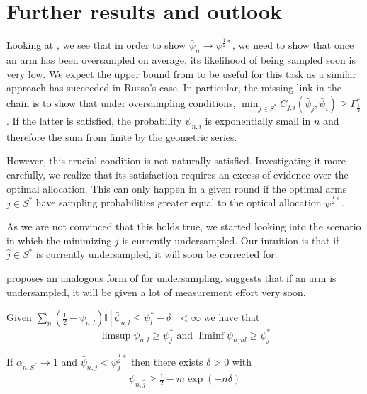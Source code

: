 \section{Further results and outlook}

Looking at , we see that in
order to show $\bar{\psi}_n \rightarrow \psi^{\frac{1}{2}*}$, we need to show
that once an arm has been oversampled on average, its likelihood of being
sampled soon is very low. We expect the upper bound from
 to be useful for this task as a similar approach has
succeeded in Russo's case. In particular, the missing link in the chain is to
show that under oversampling conditions, $\min_{j \in S^*} C_{j,
i}(\bar{\psi}_j, \bar{\psi}_i) \geq \Gamma^*_{\frac{1}{2}}$. If the latter is
satisfied, the probability $\psi_{n, i}$ is exponentially small in $n$ and
therefore the sum from  finite
by the geometric series.

However, this crucial condition is not naturally satisfied. Investigating it
more carefully, we realize that its satisfaction requires an excess of evidence
over the optimal allocation. This can only happen in a given round if the
optimal arms $j \in S^*$ have sampling probabilities greater equal to the
optical allocation $\psi^{\frac{1}{2}*}$.

As we are not convinced that this holds true, we started looking into the
scenario in which the minimizing $j$ is currently undersampled. Our intuition is
that if $\hat{j} \in S^*$ is currently undersampled, it will soon be corrected
for.

 proposes an analogous form of
 for undersampling.
 suggests that if an arm is undersampled, it will
be given a lot of measurement effort very soon.
\begin{lemma}\label{lemma:limsup_undersampling}
  Given $\sum_n(\frac{1}{2} - \psi_{n, l}) \mathbb{I}[\bar{\psi}_{n, l} \leq
    \psi_l^* - \delta] < \infty$ we have that
  \[\limsup \bar{\psi}_{n, l} \geq \psi_j^* \text{ and } \liminf \bar{\psi}_{n,
      ul} \geq \psi_j^*\]
\end{lemma}
\begin{lemma}\label{lemma:psi_undersampled}
  If $\alpha_{n, S^*} \rightarrow 1$ and $\bar{\psi}_{n, j} < \psi^{\frac{1}{2}*}_j$ then there exists $\delta > 0$
  with
  \begin{align}
    \psi_{n, \hat{j}} \geq \frac{1}{2} - m\exp(-n \delta)
  \end{align}
\end{lemma}

